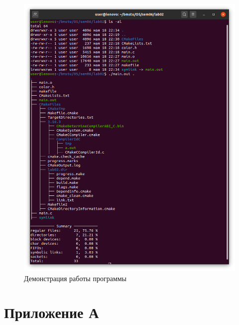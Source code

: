 \documentclass[a4paper,oneside,12pt]{extreport}
\begin{document}




\begin{figure}[H]
	\centering
	\includegraphics[width=\linewidth]{inc/img/tree}
	\caption{Демонстрация работы программы}
	\label{img:tree}
\end{figure}

\section*{Приложение А}


\end{document}
